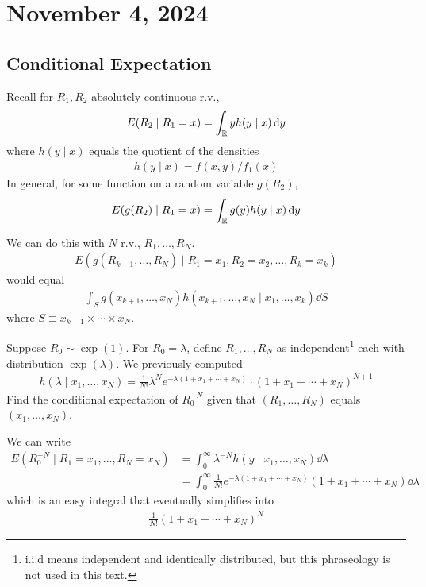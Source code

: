 \section{November 4, 2024}

\subsection{Conditional Expectation}
Recall for $R_1,R_2$ absolutely continuous r.v.,
\begin{align}
    E(R_2 \mid R_1 = x) = \int_{\mathbb{R}} y h(y \mid x) \dd{y}
\end{align}
where $h(y \mid x)$ equals the quotient of the densities
\begin{align}
    h(y \mid x) = f(x,y) / f_1(x)
\end{align}
In general, for some function on a random variable $g(R_2)$,
\begin{align}
    E(g(R_2) \mid R_1 = x) = \int_{\mathbb{R}} g(y) h(y \mid x) \dd{y}
\end{align}
\begin{proposition}
    We can do this with $N$ r.v., $R_1, \ldots, R_N$.
    \begin{align}
        E(g(R_{k+1}, \ldots, R_N) \mid R_1 = x_1, R_2 = x_2, \ldots, R_k = x_k)
    \end{align}
    would equal
    \begin{align}
        \int_S g(x_{k+1}, \ldots, x_N) h(x_{k+1}, \ldots, x_N \mid x_1, \ldots, x_k) \dd{S}
    \end{align}
    where $S \equiv x_{k+1} \times \cdots \times x_N$.
\end{proposition}
\begin{example}
    Suppose $R_0 \sim \exp(1)$. For $R_0 = \lambda$, define $R_1, \ldots, R_N$ as independent\footnote{i.i.d means independent and identically distributed, but this phraseology is not used in this text.} each with distribution $\exp(\lambda)$. We previously computed
    \begin{align}
        h(\lambda \mid x_1, \ldots, x_N) = \frac{1}{N!}\lambda^N e^{-\lambda(1+x_1 + \cdots + x_N)} \cdot (1 + x_1 + \cdots + x_N)^{N+1}
    \end{align}
    Find the conditional expectation of $R_0^{-N}$ given that $(R_1, \ldots, R_N)$ equals $(x_1, \ldots, x_N)$.
\end{example}
\begin{solution}
    We can write
    \begin{align}
        E(R_0^{-N} \mid R_1 = x_1, \ldots, R_N = x_N) &= \int_0^\infty \lambda^{-N} h(y \mid x_1, \ldots, x_N) \dd{\lambda}\\
        &= \int_0^\infty \frac{1}{N!}e^{-\lambda(1+x_1+\cdots+x_N)}(1+x_1+\cdots+x_N) \dd{\lambda}
    \end{align}
    which is an easy integral that eventually simplifies into
    \begin{align}
        \frac{1}{N!}(1+x_1+\cdots+x_N)^{N}
    \end{align}
\end{solution}

